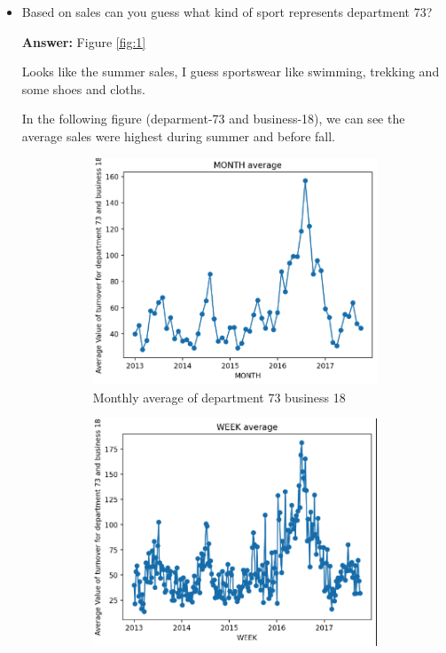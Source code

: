 \begin{itemize}
    \item Based on sales can you guess what kind of sport represents department 73?\par \textbf{Answer:} Figure \ref{fig:1}\par
    Looks like the summer sales, I guess sportswear like swimming, trekking and some shoes and cloths. \par
    In the following figure (deparment-73 and business-18), we can see the average sales were highest during summer and before fall. 
    \begin{figure}[htbp]
        \centering
        \begin{subfigure}[b]{0.45\textwidth}
            \centering
            \includegraphics[width=\textwidth]{figures/month_avg_73.png}
            \caption{Monthly average of department 73 business 18}
            \label{fig:1.1}
        \end{subfigure}
        \hfill
        \begin{subfigure}[b]{0.45\textwidth}
            \centering
            \includegraphics[width=\textwidth]{figures/week_avg_73.png}

\end{subfigure}
\end{figure}
\end{itemize}
